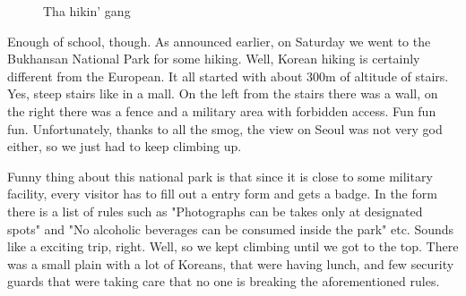 \begin{post}
\begin{content}
\begin{figure}
\centering\vspace{-12pt}
\vspace{-8pt}
\caption*{Tha hikin' gang}
\vspace{-25pt}
\end{figure}Enough of school, though. As announced earlier, on Saturday we went to the Bukhansan National Park for some hiking. Well, Korean hiking is certainly different from the European. It all started with about 300m of altitude of stairs. Yes, steep stairs like in a mall. On the left from the stairs there was a wall, on the right there was a fence and a military area with forbidden access. Fun fun fun. Unfortunately, thanks to all the smog, the view on Seoul was not very god either, so we just had to keep climbing up.



Funny thing about this national park is that since it is close to some military facility, every visitor has to fill out a entry form and gets a badge. In the form there is a list of rules such as "Photographs can be takes only at designated spots" and "No alcoholic beverages can be consumed inside the park" etc. Sounds like a exciting trip, right. Well, so we kept climbing until we got to the top. There was a small plain with a lot of Koreans, that were having lunch, and few security guards that were taking care that no one is breaking the aforementioned rules.


\end{content}
\end{post}
